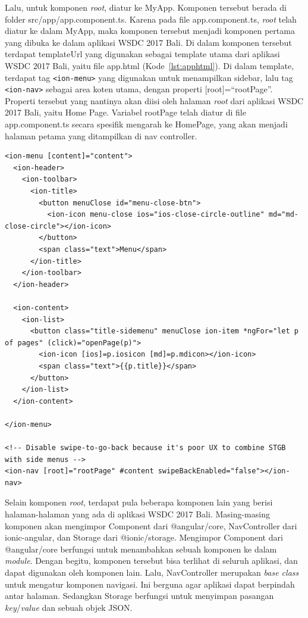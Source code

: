 Lalu, untuk komponen \textit{root}, diatur ke MyApp. Komponen tersebut berada di folder src/app/app.component.ts. Karena pada file app.component.ts, \textit{root} telah diatur ke dalam MyApp, maka komponen tersebut menjadi komponen pertama yang dibuka ke dalam aplikasi WSDC 2017 Bali. Di dalam komponen tersebut terdapat templateUrl yang digunakan sebagai template utama dari aplikasi WSDC 2017 Bali, yaitu file app.html (Kode~\ref{lst:apphtml}). Di dalam template, terdapat tag \texttt{<ion-menu>} yang digunakan untuk menampilkan sidebar, lalu tag \texttt{<ion-nav>} sebagai area koten utama, dengan properti [root]=``rootPage''. Properti tersebut yang nantinya akan diisi oleh halaman \textit{root} dari aplikasi WSDC 2017 Bali, yaitu Home Page. Variabel rootPage telah diatur di file app.component.ts secara spesifik mengarah ke HomePage, yang akan menjadi halaman petama yang ditampilkan di nav controller. 

\newpage

\begin{lstlisting}[label={lst:apphtml}, caption=\textit{Source Code} File app.html]
<ion-menu [content]="content">
  <ion-header>
    <ion-toolbar>
      <ion-title>
        <button menuClose id="menu-close-btn">
          <ion-icon menu-close ios="ios-close-circle-outline" md="md-close-circle"></ion-icon>
        </button>
        <span class="text">Menu</span>
      </ion-title>
    </ion-toolbar>
  </ion-header>

  <ion-content>
    <ion-list>
      <button class="title-sidemenu" menuClose ion-item *ngFor="let p of pages" (click)="openPage(p)">
        <ion-icon [ios]=p.iosicon [md]=p.mdicon></ion-icon>
        <span class="text">{{p.title}}</span>
      </button>
    </ion-list>
  </ion-content>

</ion-menu>

<!-- Disable swipe-to-go-back because it's poor UX to combine STGB with side menus -->
<ion-nav [root]="rootPage" #content swipeBackEnabled="false"></ion-nav>

\end{lstlisting} 

Selain komponen \textit{root}, terdapat pula beberapa komponen lain yang berisi halaman-halaman yang ada di aplikasi WSDC 2017 Bali. Masing-masing komponen akan mengimpor Component dari @angular/core, NavController dari ionic-angular, dan Storage dari @ionic/storage. Mengimpor Component dari @angular/core berfungsi untuk menambahkan sebuah komponen ke dalam \textit{module}. Dengan begitu, komponen tersebut bisa terlihat di seluruh aplikasi, dan dapat digunakan oleh komponen lain. Lalu, NavController merupakan \textit{base class} untuk mengatur komponen navigasi. Ini berguna agar aplikasi dapat berpindah antar halaman. Sedangkan Storage berfungsi untuk menyimpan pasangan \textit{key}/\textit{value} dan sebuah objek JSON.

